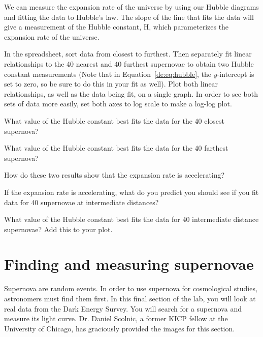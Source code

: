 We can measure the expansion rate of the universe by using our Hubble
diagrams and fitting the data to Hubble’s law. The slope of the line that
fits the data will give a measurement of the Hubble constant, H, which
parameterizes the expansion rate of the universe.

\begin{steps}
	\item In the spreadsheet, sort data from closest to furthest. Then separately fit linear relationships to the 40 nearest and 40 furthest supernovae to obtain two Hubble constant measurements (Note that in Equation~\ref{de:eq:hubble}, the $y$-intercept is set to zero, so be sure to do this in your fit as well). Plot both linear relationships, as well as the data being fit, on a single graph. In order to see both sets of data more easily, set both axes to log scale to make a log-log plot.
	
	\item What value of the Hubble constant best fits the data for the 40
	closest supernova?
	
	\item What value of the Hubble constant best fits the data for the 40
	farthest supernova?
	
	\item How do these two results show that the expansion rate is accelerating?
	
	\item If the expansion rate is accelerating, what do you predict you
	should see if you fit data for 40 supernovae at intermediate
	distances?
	
	\item What value of the Hubble constant best fits the data for 40
	intermediate distance supernovae? Add this to your plot.
\end{steps}

\section{Finding and measuring supernovae}

Supernova are random events. In order to use supernova for
cosmological studies, astronomers must find them first. In this final
section of the lab, you will look at real data from the Dark Energy
Survey. You will search for a supernova and measure its light curve. Dr.
Daniel Scolnic, a former KICP fellow at the University of Chicago, has graciously
provided the images for this section.

